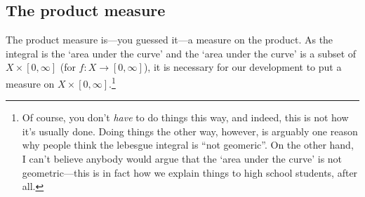\subsection{The product measure}

The product measure is---you guessed it---a measure on the product.  As the integral is the `area under the curve' and the `area under the curve' is a subset of $X\times [0,\infty ]$ (for $f:X\rightarrow [0,\infty ]$), it is necessary for our development to put a measure on $X\times [0,\infty ]$.\footnote{Of course, you don't \emph{have} to do things this way, and indeed, this is not how it's usually done.  Doing things the other way, however, is arguably one reason why people think the lebesgue integral is ``not geomeric''.  On the other hand, I can't believe anybody would argue that the `area under the curve' is not geometric---this is in fact how we explain things to high school students, after all.}
